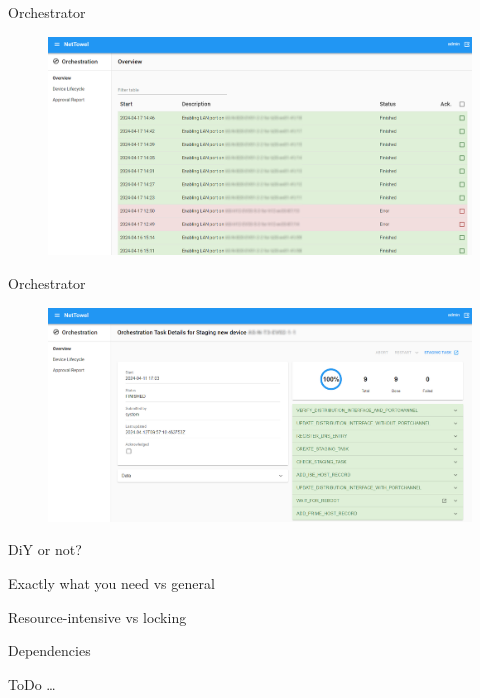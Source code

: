 \documentclass[aspectratio=169]{beamer}
\begin{document}

\begin{frame}{Orchestrator}

  \begin{figure}
    \includegraphics[height = 0.8\textheight]{images/nettowel_orchestration_overview.png}
  \end{figure}

\end{frame}



\begin{frame}{Orchestrator}

  \begin{figure}
    \includegraphics[height = 0.8\textheight]{images/nettowel_orchestration_new_device.png}
  \end{figure}

\end{frame}


\begin{frame}{DiY or not?}

  \begin{vfilleditems}
    \item Exactly what you need vs general
    \item Resource-intensive vs locking
    \item Dependencies
    \item ToDo \dots
  \end{vfilleditems}

\end{frame}
\end{document}
